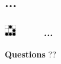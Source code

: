 \documentclass[slidetop,11pt]{beamer}
\def\sectionPartIVe{...}
\def\moreInFrameTitle{\includegraphics[height=0.5cm]{img/logo_glider.png}~~~~~}
\begin{document}
\subsection{\sectionPartIVe}
\begin{frame}
	\frametitle{\moreInFrameTitle \sectionPartIVe}
	{\centering \textbf{Questions} ?? }
\end{frame} 
\end{document}
